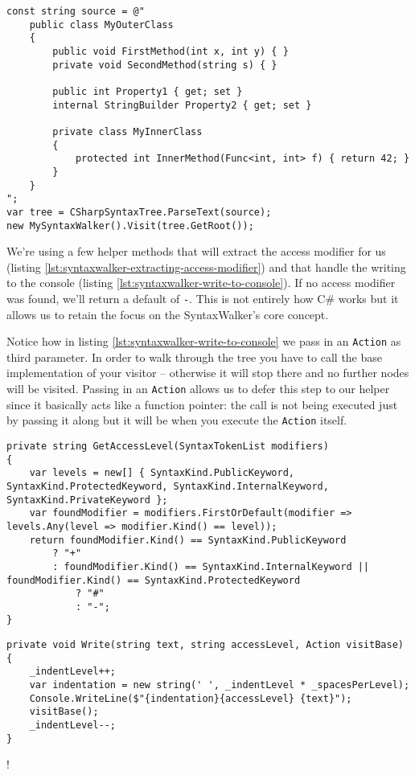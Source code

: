 \begin{lstlisting}[label={lst:syntaxwalker-visiting-from-root}]
const string source = @"
	public class MyOuterClass
	{
	    public void FirstMethod(int x, int y) { }
	    private void SecondMethod(string s) { }
	
	    public int Property1 { get; set }
	    internal StringBuilder Property2 { get; set }
	
	    private class MyInnerClass
	    {
	        protected int InnerMethod(Func<int, int> f) { return 42; }
	    }
	}
";
var tree = CSharpSyntaxTree.ParseText(source);
new MySyntaxWalker().Visit(tree.GetRoot());
\end{lstlisting}

We're using a few helper methods that will extract the access modifier for us (listing \ref{lst:syntaxwalker-extracting-access-modifier}) and that handle the writing to the console (listing \ref{lst:syntaxwalker-write-to-console}). If no access modifier was found, we'll return a default of \texttt{-}. This is not entirely how C\# works but it allows us to retain the focus on the SyntaxWalker's core concept.

Notice how in listing \ref{lst:syntaxwalker-write-to-console} we pass in an \texttt{Action} as third parameter. In order to walk through the tree you have to call the base implementation of your visitor -- otherwise it will stop there and no further nodes will be visited. Passing in an \texttt{Action} allows us to defer this step to our helper since it basically acts like a function pointer: the call is not being executed just by passing it along but it will be when you execute the \texttt{Action} itself.

\begin{lstlisting}[label={lst:syntaxwalker-extracting-access-modifier}]
private string GetAccessLevel(SyntaxTokenList modifiers)
{
    var levels = new[] { SyntaxKind.PublicKeyword, SyntaxKind.ProtectedKeyword, SyntaxKind.InternalKeyword, SyntaxKind.PrivateKeyword };
    var foundModifier = modifiers.FirstOrDefault(modifier => levels.Any(level => modifier.Kind() == level));
    return foundModifier.Kind() == SyntaxKind.PublicKeyword
		? "+"
		: foundModifier.Kind() == SyntaxKind.InternalKeyword || foundModifier.Kind() == SyntaxKind.ProtectedKeyword
			? "#"
			: "-";
}
\end{lstlisting}

\begin{lstlisting}[label={lst:syntaxwalker-write-to-console}]
private void Write(string text, string accessLevel, Action visitBase)
{
    _indentLevel++;
    var indentation = new string(' ', _indentLevel * _spacesPerLevel);
    Console.WriteLine($"{indentation}{accessLevel} {text}");
    visitBase();
	_indentLevel--;
}
\end{lstlisting}
\ifx{\verb+$+}!\fi %


